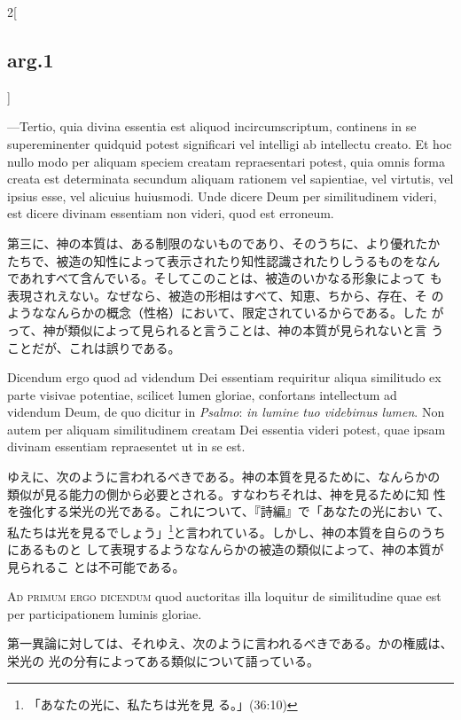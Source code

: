 \documentclass[paper=a4paper,fontsize=10pt,jafontsize=9pt,titlepage]{jlreq}
\begin{document}
\begin{paracol}{2}[\subsection{arg.1}]
\switchcolumn*

---Tertio, quia divina essentia est aliquod incircumscriptum,
continens in se supereminenter quidquid potest significari vel
intelligi ab intellectu creato. Et hoc nullo modo per aliquam speciem
creatam repraesentari potest, quia omnis forma creata est determinata
secundum aliquam rationem vel sapientiae, vel virtutis, vel ipsius
esse, vel alicuius huiusmodi. Unde dicere Deum per similitudinem
videri, est dicere divinam essentiam non videri, quod est erroneum.

\switchcolumn

第三に、神の本質は、ある制限のないものであり、そのうちに、より優れたか
たちで、被造の知性によって表示されたり知性認識されたりしうるものをなん
であれすべて含んでいる。そしてこのことは、被造のいかなる形象によって
も表現されえない。なぜなら、被造の形相はすべて、知恵、ちから、存在、そ
のようななんらかの概念（性格）において、限定されているからである。した
がって、神が類似によって見られると言うことは、神の本質が見られないと言
うことだが、これは誤りである。

\switchcolumn*

Dicendum ergo quod ad videndum Dei essentiam requiritur aliqua
similitudo ex parte visivae potentiae, scilicet lumen gloriae,
confortans intellectum ad videndum Deum, de quo dicitur in {\itshape
Psalmo}: {\itshape in lumine tuo videbimus lumen}. Non autem per aliquam
similitudinem creatam Dei essentia videri potest, quae ipsam divinam
essentiam repraesentet ut in se est.

\switchcolumn

ゆえに、次のように言われるべきである。神の本質を見るために、なんらかの
類似が見る能力の側から必要とされる。すなわちそれは、神を見るために知
性を強化する栄光の光である。これについて、『詩編』で「あなたの光におい
て、私たちは光を見るでしょう」\footnote{「あなたの光に、私たちは光を見
る。」(36:10)}と言われている。しかし、神の本質を自らのうちにあるものと
して表現するようななんらかの被造の類似によって、神の本質が見られるこ
とは不可能である。

\switchcolumn*[\subsection{ad.1}]

{\scshape  Ad primum ergo dicendum} quod auctoritas illa loquitur de
similitudine quae est per participationem luminis gloriae.

\switchcolumn

第一異論に対しては、それゆえ、次のように言われるべきである。かの権威は、栄光の
光の分有によってある類似について語っている。


\end{paracol}
\end{document}
